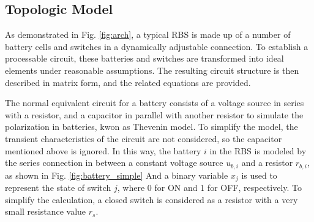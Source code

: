 \documentclass{article}
\begin{document}
\subsection{Topologic Model}

As demonstrated in Fig. \ref{fig:arch}, a typical RBS is made up of a number of battery cells and switches in a dynamically adjustable connection.
To establish a processable circuit, these batteries and switches are transformed into ideal elements under reasonable assumptions.
The resulting circuit structure is then described in matrix form, and the related equations are provided.


The normal equivalent circuit for a battery consists of a voltage source in series with a resistor, and a capacitor in parallel with another resistor to simulate the polarization in batteries, kwon as Thevenin model\cite{hongwenheStateofChargeEstimationLithiumIon2011,mousavig.VariousBatteryModels2014}.
To simplify the model, the transient characteristics of the circuit are not considered, so the capacitor mentioned above is ignored.
In this way, the battery $i$ in the RBS is modeled by the series connection in between a constant voltage source $u_{b,i}$ and a resistor $r_{b,i}$,  as shown in Fig. \ref{fig:battery_simple}
And a binary variable $x_j$ is used to represent the state of switch $j$, where 0 for ON and 1 for OFF, respectively.
To simplify the calculation, a closed switch is considered as a resistor with a very small resistance value $r_s$.
\end{document}
